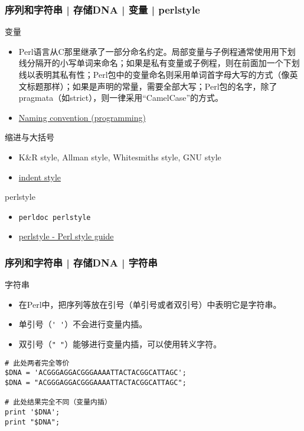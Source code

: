\begin{frame}[fragile]
  \frametitle{序列和字符串 | 存储DNA | 变量 | perlstyle}
  \begin{block}{变量}
    \begin{itemize}
      \item {\small 
Perl语言从C那里继承了一部分命名约定。局部变量与子例程通常使用用下划线分隔开的小写单词来命名；如果是私有变量或子例程，则在前面加一个下划线以表明其私有性；Perl包中的变量命名则采用单词首字母大写的方式（像英文标题那样）；如果是声明的常量，需要全部大写；Perl包的名字，除了pragmata（如strict），则一律采用“CamelCase”的方式。}
      \item \href{https://en.wikipedia.org/wiki/Naming\_convention\_(programming)}{Naming convention (programming)}
    \end{itemize}
  \end{block}
  \pause
  \vspace{-0.5em}
  \begin{block}{缩进与大括号}
    \begin{itemize}
      \item K\&R style, Allman style, Whitesmiths style, GNU style
      \item \href{http://catb.org/jargon/html/I/indent-style.html}{indent style}
    \end{itemize}
  \end{block}
  \pause
  \vspace{-0.5em}
  \begin{block}{perlstyle}
    \begin{itemize}
      \item \verb|perldoc perlstyle|
      \item \href{http://perldoc.perl.org/perlstyle.html}{perlstyle - Perl style guide}
    \end{itemize}
  \end{block}
\end{frame}

\begin{frame}[fragile]
  \frametitle{序列和字符串 | 存储DNA | \alert{字符串}}
  \begin{block}{字符串}
    \begin{itemize}
      \item 在Perl中，把序列等放在引号（单引号或者双引号）中表明它是字符串。
      \item 单引号（\verb|' '|）不会进行变量内插。
      \item 双引号（\verb|" "|）能够进行变量内插，可以使用转义字符。
    \end{itemize}
  \end{block}
  \pause
\begin{lstlisting}
# 此处两者完全等价
$DNA = 'ACGGGAGGACGGGAAAATTACTACGGCATTAGC';
$DNA = "ACGGGAGGACGGGAAAATTACTACGGCATTAGC";

# 此处结果完全不同（变量内插）
print '$DNA';
print "$DNA";
\end{lstlisting}
\end{frame}

